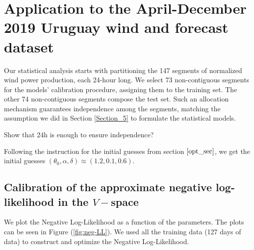 \documentclass[11pt]{article}
\theoremstyle{definition}
\begin{document}

\section{Application to the April-December 2019 Uruguay wind and forecast dataset} \label{Section_6}

Our statistical analysis starts with partitioning the 147 segments of normalized wind power production, each 24-hour long. We select 73 non-contiguous segments for the models' calibration procedure, assigning them to the training set. The other 74 non-contiguous segments compose the test set. Such an allocation mechanism guarantees independence among the segments, matching the assumption we did in Section \ref{Section_5} to formulate the statistical models.

{ \color{red} Show that 24h is enough to ensure independence?}

Following the instruction for the initial guesses from section $\ref{opt_sec}$, we get the initial guesses $(\theta_0,\alpha,\delta)\approx(1.2,0.1,0.6)$.

\subsection{Calibration of the approximate negative log-likelihood in the $V-$space}

We plot the Negative Log-Likelihood as a function of the parameters. The plots can be seen in Figure (\ref{fig:neg-LL}). We used all the training data (127 days of data) to construct and optimize the Negative Log-Likelihood.
\end{document}
